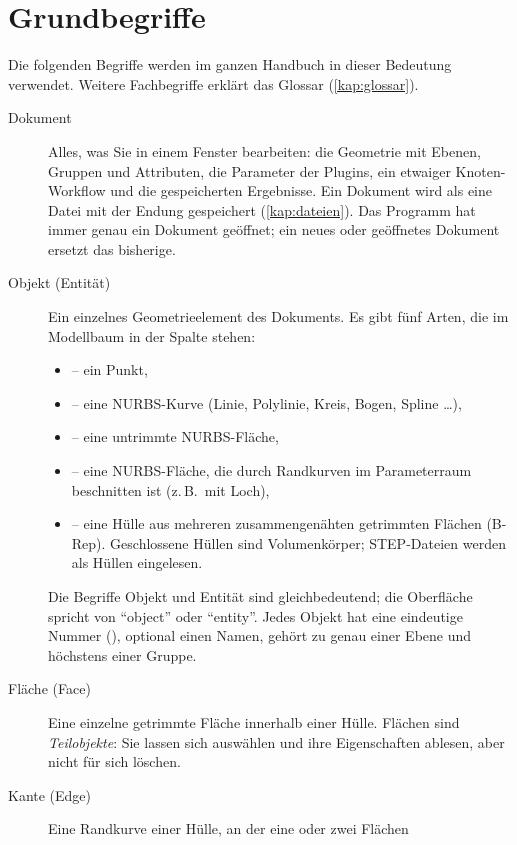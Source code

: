 \section{Grundbegriffe}\label{sec:begriffe}

Die folgenden Begriffe werden im ganzen Handbuch in dieser Bedeutung verwendet. Weitere
Fachbegriffe erklärt das Glossar (\autoref{kap:glossar}).

\begin{description}
  \item[Dokument] Alles, was Sie in einem Fenster bearbeiten: die Geometrie
    mit Ebenen, Gruppen und Attributen, die Parameter der Plugins, ein etwaiger
    Knoten-Workflow und die gespeicherten Ergebnisse. Ein Dokument wird als eine Datei mit
    der Endung  gespeichert (\autoref{kap:dateien}). Das Programm hat immer genau
    ein Dokument geöffnet; ein neues oder geöffnetes Dokument ersetzt das bisherige.
  \item[Objekt (Entität)] Ein einzelnes Geometrieelement des
    Dokuments. Es gibt fünf Arten, die im Modellbaum in der Spalte  stehen:
    \begin{itemize}
      \item {} -- ein Punkt,
      \item {} -- eine NURBS-Kurve (Linie, Polylinie, Kreis, Bogen, Spline \dots),
      \item {} -- eine untrimmte NURBS-Fläche,
      \item {} -- eine NURBS-Fläche, die durch Randkurven im
        Parameterraum beschnitten ist (z.\,B.\ mit Loch),
      \item {} -- eine Hülle aus mehreren zusammengenähten getrimmten Flächen
        (B-Rep). Geschlossene Hüllen sind Volumenkörper; STEP-Dateien werden als Hüllen
        eingelesen.
    \end{itemize}
    Die Begriffe Objekt und Entität sind gleichbedeutend; die Oberfläche spricht von
    \enquote{object} oder \enquote{entity}. Jedes Objekt hat eine eindeutige Nummer (),
    optional einen Namen, gehört zu genau einer Ebene und höchstens einer Gruppe.
  \item[Fläche (Face)] Eine einzelne getrimmte Fläche innerhalb einer Hülle.
    Flächen sind \emph{Teilobjekte}: Sie lassen sich auswählen und ihre Eigenschaften ablesen,
    aber nicht für sich löschen.
  \item[Kante (Edge)] Eine Randkurve einer Hülle, an der eine oder zwei Flächen

\end{description}
